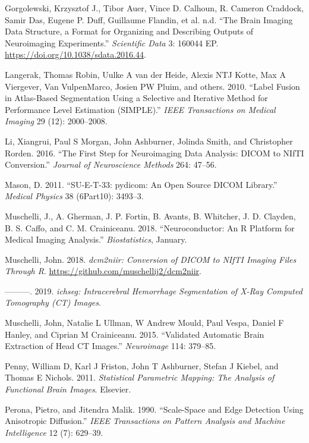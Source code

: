 \documentclass[]{elsarticle} %
\begin{document}
\leavevmode\hypertarget{ref-bids}{}%
Gorgolewski, Krzysztof J., Tibor Auer, Vince D. Calhoun, R. Cameron Craddock, Samir Das, Eugene P. Duff, Guillaume Flandin, et al. n.d. ``The Brain Imaging Data Structure, a Format for Organizing and Describing Outputs of Neuroimaging Experiments.'' \emph{Scientific Data} 3: 160044 EP. \url{https://doi.org/10.1038/sdata.2016.44}.

\leavevmode\hypertarget{ref-langerak2010label}{}%
Langerak, Thomas Robin, Uulke A van der Heide, Alexis NTJ Kotte, Max A Viergever, Van VulpenMarco, Josien PW Pluim, and others. 2010. ``Label Fusion in Atlas-Based Segmentation Using a Selective and Iterative Method for Performance Level Estimation (SIMPLE).'' \emph{IEEE Transactions on Medical Imaging} 29 (12): 2000--2008.

\leavevmode\hypertarget{ref-dcm2niix}{}%
Li, Xiangrui, Paul S Morgan, John Ashburner, Jolinda Smith, and Christopher Rorden. 2016. ``The First Step for Neuroimaging Data Analysis: DICOM to NIfTI Conversion.'' \emph{Journal of Neuroscience Methods} 264: 47--56.

\leavevmode\hypertarget{ref-pydicom}{}%
Mason, D. 2011. ``SU-E-T-33: pydicom: An Open Source DICOM Library.'' \emph{Medical Physics} 38 (6Part10): 3493--3.

\leavevmode\hypertarget{ref-neuroconductor}{}%
Muschelli, J., A. Gherman, J. P. Fortin, B. Avants, B. Whitcher, J. D. Clayden, B. S. Caffo, and C. M. Crainiceanu. 2018. ``Neuroconductor: An R Platform for Medical Imaging Analysis.'' \emph{Biostatistics}, January.

\leavevmode\hypertarget{ref-dcm2niir}{}%
Muschelli, John. 2018. \emph{dcm2niir: Conversion of DICOM to NIfTI Imaging Files Through R}. \url{https://github.com/muschellij2/dcm2niir}.

\leavevmode\hypertarget{ref-ichseg}{}%
---------. 2019. \emph{ichseg: Intracerebral Hemorrhage Segmentation of X-Ray Computed Tomography (CT) Images}.

\leavevmode\hypertarget{ref-ctbet}{}%
Muschelli, John, Natalie L Ullman, W Andrew Mould, Paul Vespa, Daniel F Hanley, and Ciprian M Crainiceanu. 2015. ``Validated Automatic Brain Extraction of Head CT Images.'' \emph{Neuroimage} 114: 379--85.

\leavevmode\hypertarget{ref-spm}{}%
Penny, William D, Karl J Friston, John T Ashburner, Stefan J Kiebel, and Thomas E Nichols. 2011. \emph{Statistical Parametric Mapping: The Analysis of Functional Brain Images}. Elsevier.

\leavevmode\hypertarget{ref-peronamalik}{}%
Perona, Pietro, and Jitendra Malik. 1990. ``Scale-Space and Edge Detection Using Anisotropic Diffusion.'' \emph{IEEE Transactions on Pattern Analysis and Machine Intelligence} 12 (7): 629--39.
\end{document}
